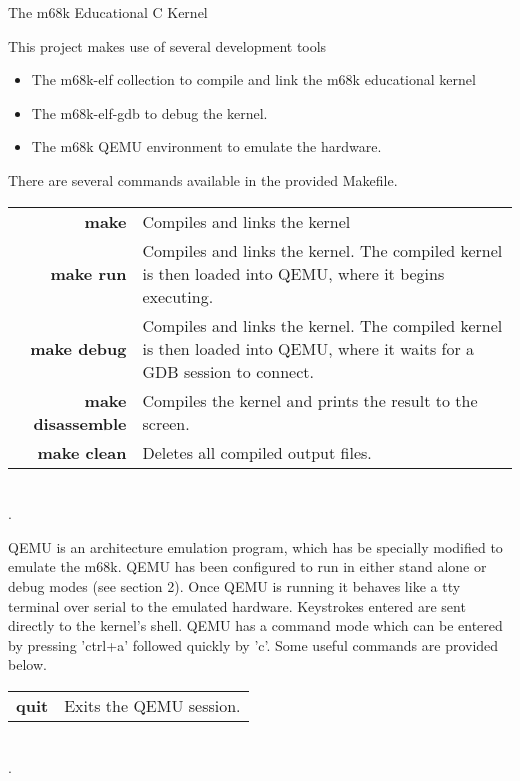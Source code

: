 \documentclass{article}
\begin{document}
\begin{center}
{\huge The m68k Educational C Kernel}
\end{center}

This project makes use of several development tools
\begin{itemize}
\item The m68k-elf collection to compile and link the m68k educational kernel
\item The m68k-elf-gdb to debug the kernel.
\item The m68k QEMU environment to emulate the hardware.
\end{itemize}


There are several commands available in the provided Makefile.\\

\begin{tabulary}{\textwidth}{r L}
\bf{make} & Compiles and links the kernel\\
\bf{make run} & Compiles and links the kernel. The compiled kernel is then loaded into QEMU, where it begins executing.\\
\bf{make debug} & Compiles and links the kernel. The compiled kernel is then loaded into QEMU, where it waits for a GDB session to connect.\\
\bf{make disassemble} & Compiles the kernel and prints the result to the screen.\\
\bf{make clean} & Deletes all compiled output files.
\end{tabulary}\\
{\tiny.}\\


QEMU is an architecture emulation program, which has be specially modified to emulate the m68k. QEMU has been configured to run in either stand alone or debug modes (see section 2). Once QEMU is running it behaves like a tty terminal over serial to the emulated hardware. Keystrokes entered are sent directly to the kernel's shell. QEMU has a command mode which can be entered by pressing 'ctrl+a' followed quickly by 'c'. Some useful commands are provided below.\\

\begin{tabulary}{\textwidth}{r L}
\bf{quit} & Exits the QEMU session.\\
\end{tabulary}\\
{\tiny.}\\
\end{document}
